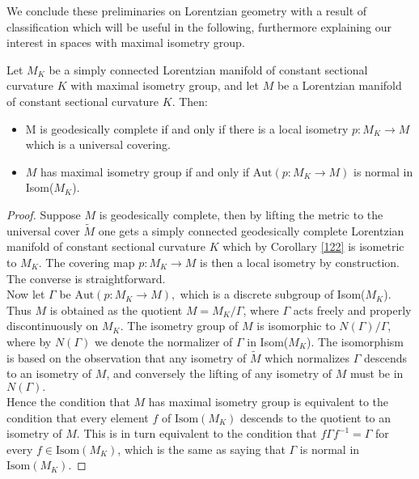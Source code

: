 We conclude these preliminaries on Lorentzian geometry with a result of classification which will be useful in the following, furthermore explaining our interest in spaces with maximal isometry group.
\begin{proposition}\label{classification}
    Let $M_K$ be a simply connected Lorentzian manifold of constant sectional curvature $K$ with maximal isometry group, and let $M$ be a Lorentzian manifold of constant sectional curvature $K$. Then: 
    \begin{itemize}
        \item M is geodesically complete if and only if there is a local isometry $p:M_K\to M$ which is a universal covering.
        \item $M$ has maximal isometry group if and only if $\text{Aut}(p:M_K\to M)$ is normal in Isom($M_K$). 
    \end{itemize}
\end{proposition}

\begin{proof}
    Suppose $M$ is geodesically complete, then by lifting the metric to the universal cover $\widetilde{M}$ one gets a simply connected geodesically complete Lorentzian manifold of constant sectional curvature $K$ which by Corollary \ref{122} is isometric to $M_K$. The covering map $p:M_K\to M$ is then a local isometry by construction. The converse is straightforward. \\   
    Now let $\Gamma$ be $\text{Aut}(p:M_K\to M),$ which is a discrete subgroup of Isom($M_K$). Thus $M$ is obtained as the quotient $M=M_{K}/\Gamma$, where $\Gamma$ acts freely and properly discontinuously on $M_K$. The isometry group of $M$ is isomorphic to $N(\Gamma)/\Gamma$, where by $N(\Gamma)$ we denote the normalizer of $\Gamma$ in Isom($M_K$). The isomorphism is based on the observation that any isometry of $\widetilde{M}$ which normalizes $\Gamma$ descends to an isometry of $M$, and conversely the lifting of any isometry of $M$ must be in $N(\Gamma).$\\
    Hence the condition that $M$ has maximal isometry group is equivalent to the condition that every element $f$ of $\text{Isom}(M_K)$ descends to the quotient to an isometry of $M$. This is in turn equivalent to the condition that $f\Gamma f^{-1}=\Gamma$ for every $f\in \text{Isom}(M_K)$, which is the same as saying that $\Gamma$ is normal in $\text{Isom}(M_K)$.
\end{proof}


